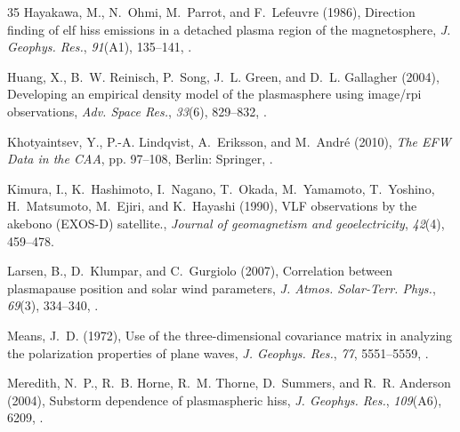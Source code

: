 \documentclass[a4paper]{article}
\renewenvironment{thebibliography}[1]{\begin{oldthebibliography}{#1}\setlength{\parskip}{0ex}\setlength{\itemsep}{0ex}}{\end{oldthebibliography}}
\begin{document}
\begin{thebibliography}{35}
Hayakawa, M., N.~Ohmi, M.~Parrot, and F.~Lefeuvre (1986), Direction finding of
  elf hiss emissions in a detached plasma region of the magnetosphere,
  \textit{J. Geophys. Res.}, \textit{91}(A1), 135--141,
  .

Huang, X., B.~W. Reinisch, P.~Song, J.~L. Green, and D.~L. Gallagher (2004),
  Developing an empirical density model of the plasmasphere using image/rpi
  observations, \textit{Adv. Space Res.}, \textit{33}(6), 829--832,
  .

{Khotyaintsev}, Y., P.-A. {Lindqvist}, A.~{Eriksson}, and M.~{Andr{\'e}}
  (2010), \textit{The EFW Data in the CAA}, pp. 97--108, Berlin: Springer,
  .

Kimura, I., K.~Hashimoto, I.~Nagano, T.~Okada, M.~Yamamoto, T.~Yoshino,
  H.~Matsumoto, M.~Ejiri, and K.~Hayashi (1990), {VLF} observations by the
  akebono ({EXOS-D}) satellite., \textit{Journal of geomagnetism and
  geoelectricity}, \textit{42}(4), 459--478.

Larsen, B., D.~Klumpar, and C.~Gurgiolo (2007), Correlation between plasmapause
  position and solar wind parameters, \textit{J. Atmos. Solar-Terr. Phys.},
  \textit{69}(3), 334--340, .

{Means}, J.~D. (1972), Use of the three-dimensional covariance matrix in
  analyzing the polarization properties of plane waves, \textit{J. Geophys.
  Res.}, \textit{77}, 5551--5559, .

Meredith, N.~P., R.~B. Horne, R.~M. Thorne, D.~Summers, and R.~R. Anderson
  (2004), Substorm dependence of plasmaspheric hiss, \textit{J. Geophys. Res.},
  \textit{109}(A6), 6209, .


\end{thebibliography}
\end{document}
